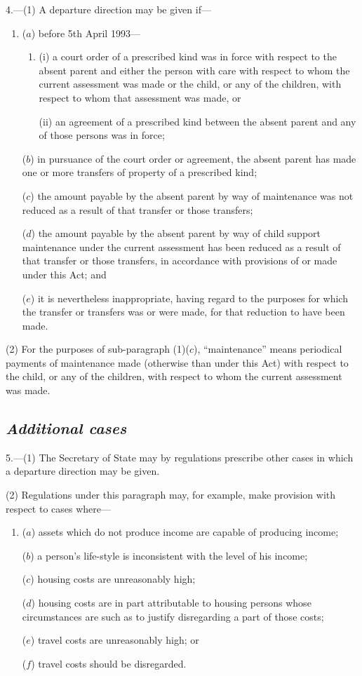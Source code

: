 \documentclass[12pt,a4paper]{article}
\begin{document}
4.---(1) A departure direction may be given if—
\begin{enumerate}\item[]
($a$) before 5th April 1993—
\begin{enumerate}\item[]
(i) a court order of a prescribed kind was in force with respect to the absent parent and either the person with care with respect to whom the current assessment was made or the child, or any of the children, with respect to whom that assessment was made, or

(ii) an agreement of a prescribed kind between the absent parent and any of those persons was in force;
\end{enumerate}

($b$) in pursuance of the court order or agreement, the absent parent has made one or more transfers of property of a prescribed kind;

($c$) the amount payable by the absent parent by way of maintenance was not reduced as a result of that transfer or those transfers;

($d$) the amount payable by the absent parent by way of child support maintenance under the current assessment has been reduced as a result of that transfer or those transfers, in accordance with provisions of or made under this Act; and

($e$) it is nevertheless inappropriate, having regard to the purposes for which the transfer or transfers was or were made, for that reduction to have been made.
\end{enumerate}

(2) For the purposes of sub-paragraph (1)($c$), “maintenance” means periodical payments of maintenance made (otherwise than under this Act) with respect to the child, or any of the children, with respect to whom the current assessment was made.

\subsection*{\itshape Additional cases}

5.---(1) The Secretary of State may by regulations prescribe other cases in which a departure direction may be given.

(2) Regulations under this paragraph may, for example, make provision with respect to cases where—
\begin{enumerate}\item[]
($a$) assets which do not produce income are capable of producing income;

($b$) a person’s life-style is inconsistent with the level of his income;

($c$) housing costs are unreasonably high;

($d$) housing costs are in part attributable to housing persons whose circumstances are such as to justify disregarding a part of those costs;

($e$) travel costs are unreasonably high; or

($f$) travel costs should be disregarded.
\end{enumerate}
\end{document}
